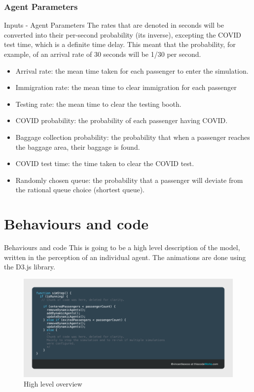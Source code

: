 \documentclass{beamer}
\begin{document}
\subsubsection*{Agent Parameters}

\begin{frame}{Inputs - Agent Parameters}
	The rates that are denoted in seconds will be converted into their per-second probability (its inverse), excepting the COVID test time, which is a definite time delay. This meant that the probability, for example, of an arrival rate of 30 seconds will be 1/30 per second.
	
	\begin{itemize}
		\item Arrival rate: the mean time taken for each passenger to enter the simulation.
		\item Immigration rate: the mean time to clear immigration for each passenger
		\item Testing rate: the mean time to clear the testing booth.
		\item COVID probability: the probability of each passenger having COVID.
		\item Baggage collection probability: the probability that when a passenger reaches the baggage area, their baggage is found.
		\item COVID test time: the time taken to clear the COVID test.
		\item Randomly chosen queue: the probability that a passenger will deviate from the rational queue choice (shortest queue).
	\end{itemize}
\end{frame}
\section{Behaviours and code}

\begin{frame}{Behaviours and code}
	This is going to be a high level description of the model, written in the perception of an individual agent. The animations are done using the D3.js library.
	\begin{figure}
		\includegraphics[width=\linewidth]{../img/high-level-process}\caption{High level overview}
	\end{figure}
\end{frame}
\end{document}
